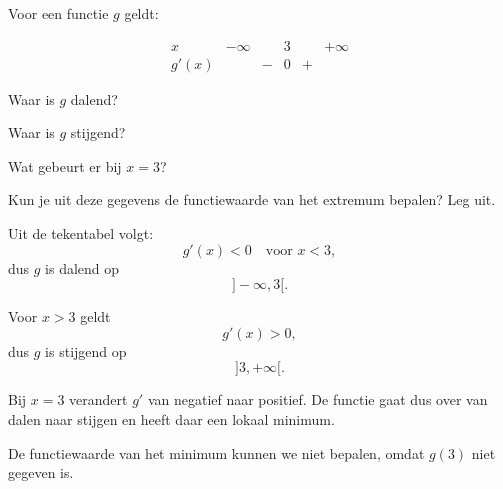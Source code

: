 \documentclass{ximera}
\begin{document}
\begin{oefening}{\oefB\ESS}

Voor een functie $g$ geldt:

\[
\begin{array}{c|ccccc}
x      & -\infty &   & 3 &   & +\infty \\ \hline
g'(x)  &         & - & 0 & + &
\end{array}
\]

\begin{question}
Waar is $g$ dalend?
\end{question}

\begin{question}
Waar is $g$ stijgend?
\end{question}

\begin{question}
Wat gebeurt er bij $x=3$?
\end{question}

\begin{question}
Kun je uit deze gegevens de functiewaarde van het extremum bepalen?
Leg uit.
\end{question}

\begin{oplossing}

Uit de tekentabel volgt:
\[
g'(x)<0 \quad \text{voor } x<3,
\]
dus $g$ is dalend op
\[
]-\infty,3[.
\]

Voor $x>3$ geldt
\[
g'(x)>0,
\]
dus $g$ is stijgend op
\[
]3,+\infty[.
\]

Bij $x=3$ verandert $g'$ van negatief naar positief. De functie gaat dus
over van dalen naar stijgen en heeft daar een lokaal minimum.

De functiewaarde van het minimum kunnen we niet bepalen, omdat $g(3)$ niet
gegeven is.

\end{oplossing}

\end{oefening}


\end{document}
